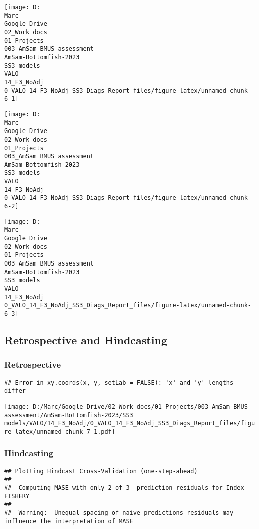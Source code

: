 \documentclass[
]{article}
\begin{document}
\begin{center}\texttt{[image: D:\\Marc\\Google Drive\\02\_Work docs\\01\_Projects\\003\_AmSam BMUS assessment\\AmSam-Bottomfish-2023\\SS3 models\\VALO\\14\_F3\_NoAdj\\0\_VALO\_14\_F3\_NoAdj\_SS3\_Diags\_Report\_files/figure-latex/unnamed-chunk-6-1]} \end{center}

\begin{center}\texttt{[image: D:\\Marc\\Google Drive\\02\_Work docs\\01\_Projects\\003\_AmSam BMUS assessment\\AmSam-Bottomfish-2023\\SS3 models\\VALO\\14\_F3\_NoAdj\\0\_VALO\_14\_F3\_NoAdj\_SS3\_Diags\_Report\_files/figure-latex/unnamed-chunk-6-2]} \end{center}

\begin{center}\texttt{[image: D:\\Marc\\Google Drive\\02\_Work docs\\01\_Projects\\003\_AmSam BMUS assessment\\AmSam-Bottomfish-2023\\SS3 models\\VALO\\14\_F3\_NoAdj\\0\_VALO\_14\_F3\_NoAdj\_SS3\_Diags\_Report\_files/figure-latex/unnamed-chunk-6-3]} \end{center}

\hypertarget{retrospective-and-hindcasting}{%
\subsection{Retrospective and
Hindcasting}\label{retrospective-and-hindcasting}}

\hypertarget{retrospective}{%
\subsubsection{Retrospective}\label{retrospective}}

\begin{verbatim}
## Error in xy.coords(x, y, setLab = FALSE): 'x' and 'y' lengths differ
\end{verbatim}

\texttt{[image: D:/Marc/Google Drive/02\_Work docs/01\_Projects/003\_AmSam BMUS assessment/AmSam-Bottomfish-2023/SS3 models/VALO/14\_F3\_NoAdj/0\_VALO\_14\_F3\_NoAdj\_SS3\_Diags\_Report\_files/figure-latex/unnamed-chunk-7-1.pdf]}

\hypertarget{hindcasting}{%
\subsubsection{Hindcasting}\label{hindcasting}}

\begin{verbatim}
## Plotting Hindcast Cross-Validation (one-step-ahead) 
## 
##  Computing MASE with only 2 of 3  prediction residuals for Index FISHERY 
## 
##  Warning:  Unequal spacing of naive predictions residuals may influence the interpretation of MASE
\end{verbatim}
\end{document}
